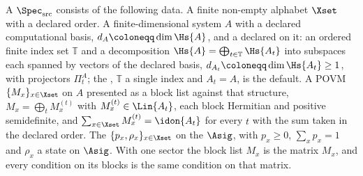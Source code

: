 \begin{definition}\label{def:source-spec}
A  $\Spec_{\mathrm{src}}$ consists of the
following data. A finite non-empty alphabet $\Xset$ with a declared order. A
finite-dimensional system $A$ with a declared computational basis,
$d_A\coloneqq\dim\Hs{A}$, and a declared  on it: an
ordered finite index set $\mathbb{T}$ and a decomposition
$\Hs{A}=\bigoplus_{t\in\mathbb{T}}\Hs{A_t}$ into subspaces each spanned by
vectors of the declared basis, $d_{A_t}\coloneqq\dim\Hs{A_t}\ge1$, with
projectors $\Pi^{A}_t$; the , $\mathbb{T}$ a
single index and $A_t=A$, is the default. A POVM $\{M_x\}_{x\in\Xset}$ on
$A$ presented as a block list against that structure,
$M_x=\bigoplus_{t}M^{(t)}_x$ with $M^{(t)}_x\in\Lin{A_t}$, each block
Hermitian and positive semidefinite, and
$\sum_{x\in\Xset}M^{(t)}_x=\idon{A_t}$ for every $t$ with the sum taken in
the declared order. The 
$\{p_x,\rho_x\}_{x\in\Xset}$ on the  $\Asig$, with
$p_x\ge0$, $\sum_xp_x=1$ and $\rho_x$ a state on $\Asig$. With one sector
the block list $M_x$ is the matrix $M_x$, and every condition on its blocks
is the same condition on that matrix.


\end{definition}
